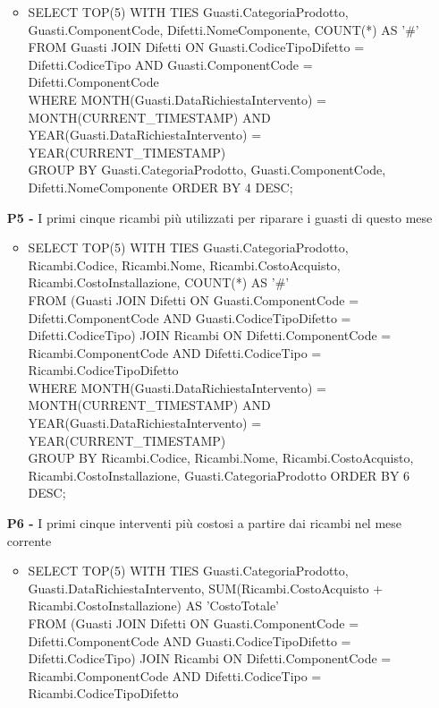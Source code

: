 \documentclass[a4paper, 12pt]{report}
\begin{document}
\begin{itemize}
		\begin{itemize}[leftmargin=*, topsep=0pt]
			\item SELECT TOP(5) WITH TIES Guasti.CategoriaProdotto, Guasti.ComponentCode, Difetti.NomeComponente, COUNT(*) AS '\#'\\
			FROM Guasti JOIN Difetti ON Guasti.CodiceTipoDifetto = Difetti.CodiceTipo AND Guasti.ComponentCode = Difetti.ComponentCode\\
			WHERE MONTH(Guasti.DataRichiestaIntervento) = MONTH(CURRENT\_TIMESTAMP) AND YEAR(Guasti.DataRichiestaIntervento) = YEAR(CURRENT\_TIMESTAMP)\\
			GROUP BY Guasti.CategoriaProdotto, Guasti.ComponentCode, Difetti.NomeComponente ORDER BY 4 DESC;
		\end{itemize}
	\item[\textbf{P5 -}] I primi cinque ricambi più utilizzati per riparare i guasti di questo mese
		\begin{itemize}[leftmargin=*, topsep=0pt]
			\item SELECT TOP(5) WITH TIES Guasti.CategoriaProdotto, Ricambi.Codice, Ricambi.Nome, Ricambi.CostoAcquisto, Ricambi.CostoInstallazione, COUNT(*) AS '\#'\\
			FROM (Guasti JOIN Difetti ON Guasti.ComponentCode = Difetti.ComponentCode AND Guasti.CodiceTipoDifetto = Difetti.CodiceTipo) JOIN Ricambi ON Difetti.ComponentCode = Ricambi.ComponentCode AND Difetti.CodiceTipo = Ricambi.CodiceTipoDifetto\\
			WHERE MONTH(Guasti.DataRichiestaIntervento) = MONTH(CURRENT\_TIMESTAMP) AND YEAR(Guasti.DataRichiestaIntervento) = YEAR(CURRENT\_TIMESTAMP)\\
			GROUP BY Ricambi.Codice, Ricambi.Nome, Ricambi.CostoAcquisto, Ricambi.CostoInstallazione, Guasti.CategoriaProdotto ORDER BY 6 DESC;
		\end{itemize}
	\item[\textbf{P6 -}] I primi cinque interventi più costosi a partire dai ricambi nel mese corrente
		\begin{itemize}[leftmargin=*, topsep=0pt]
			\item SELECT TOP(5) WITH TIES Guasti.CategoriaProdotto, Guasti.DataRichiestaIntervento, SUM(Ricambi.CostoAcquisto + Ricambi.CostoInstallazione) AS 'CostoTotale'\\
			FROM (Guasti JOIN Difetti ON Guasti.ComponentCode = Difetti.ComponentCode AND Guasti.CodiceTipoDifetto = Difetti.CodiceTipo) JOIN Ricambi ON Difetti.ComponentCode = Ricambi.ComponentCode AND Difetti.CodiceTipo = Ricambi.CodiceTipoDifetto\\

\end{itemize}
\end{itemize}
\end{document}

